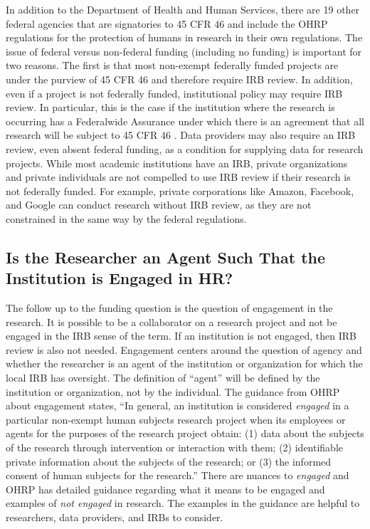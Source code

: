 In addition to the Department of Health and Human Services, there are 19 other federal agencies that are signatories to 45 CFR 46 and include the OHRP regulations for the protection of humans in research in their own regulations. The issue of federal versus non-federal funding (including no funding) is important for two reasons. The first is that most non-exempt federally funded projects are under the purview of 45 CFR 46 and therefore require IRB review. In addition, even if a project is not federally funded, institutional policy may require IRB review. In particular, this is the case if the institution where the research is occurring has a Federalwide Assurance under which there is an agreement that all research will be subject to 45 CFR 46 \citep{officeforhumanresearchprotections2017}. Data providers may also require an IRB review, even absent federal funding, as a condition for supplying data for research projects. While most academic institutions have an IRB, private organizations and private individuals are not compelled to use IRB review if their research is not federally funded. For example, private corporations like Amazon, Facebook, and Google can conduct research without IRB review, as they are not constrained in the same way by the federal regulations.

\hypertarget{is-the-researcher-an-agent-such-that-the-institution-is-engaged-in-hr}{%
\subsection{Is the Researcher an Agent Such That the Institution is Engaged in HR?}\label{is-the-researcher-an-agent-such-that-the-institution-is-engaged-in-hr}}

The follow up to the funding question is the question of engagement in the research. It is possible to be a collaborator on a research project and not be engaged in the IRB sense of the term. If an institution is not engaged, then IRB review is also not needed. Engagement centers around the question of agency and whether the researcher is an agent of the institution or organization for which the local IRB has oversight. The definition of ``agent'' will be defined by the institution or organization, not by the individual. The guidance from OHRP about engagement states, ``In general, an institution is considered \emph{engaged} in a particular non-exempt human subjects research project when its employees or agents for the purposes of the research project obtain: (1) data about the subjects of the research through intervention or interaction with them; (2) identifiable private information about the subjects of the research; or (3) the informed consent of human subjects for the research.'' \citep{codeoffederalregulations2017b} There are nuances to \emph{engaged} and OHRP has detailed guidance regarding what it means to be engaged and examples of \emph{not engaged} in research. The examples in the guidance are helpful to researchers, data providers, and IRBs to consider.

